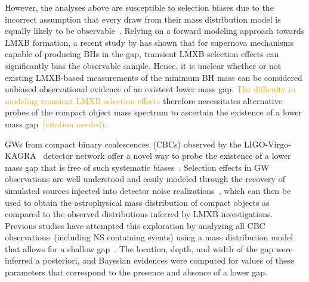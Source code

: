 \documentclass[modern]{aastex631}
\begin{document}


However, the analyses above are susceptible to selection biases due to the incorrect assumption that every draw from their mass distribution model is equally likely to be observable~\citep{Farr:2010tu, Siegel:2022gwc}. Relying on a forward modeling approach towards LMXB formation, a recent study by \cite{Siegel:2022gwc} has shown that for supernova mechanisms capable of producing BHs in the gap, transient LMXB selection effects can significantly bias the observable sample. Hence, it is unclear whether or not existing LMXB-based measurements of the minimum BH mass can be considered unbiased observational evidence of an existent lower mass gap. \textcolor{orange}{The difficulty in modeling transient LMXB selection effects} therefore necessitates alternative probes of the compact object mass spectrum to ascertain the existence of a lower mass gap~\textcolor{orange}{(citation needed)}.

GWs from compact binary coalescences~(CBCs) observed by the LIGO-Virgo-KAGRA~\citep[LVK, ][]{LIGOScientific:2014pky, VIRGO:2014yos, KAGRA:2020agh} detector network offer a novel way to probe the existence of a lower mass gap that is free of such systematic biases~\citep{Farah:2021qom,  LIGOScientific:2024elc, KAGRA:2021duu}. Selection effects in GW observations are well understood and easily modeled through the recovery of simulated sources injected into detector noise realizations~\citep{Thrane:2018qnx,Mandel:2018mve,popgw2,popgw3}, which can then be used to obtain the astrophysical mass distribution of compact objects as compared to the observed distributions inferred by LMXB investigations. Previous studies have attempted this exploration by analyzing all CBC observations~(including NS containing events) using a mass distribution model that allows for a shallow gap~\citep{Farah:2021qom,  KAGRA:2021duu, LIGOScientific:2024elc}. The location, depth, and width of the gap were inferred a posteriori, and Bayesian evidences were computed for values of these parameters that correspond to the presence and absence of a lower gap. 
\end{document}
